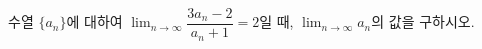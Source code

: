 수열 $\{a_n\}$에 대하여 $\displaystyle\lim_{n\to\infty}\dfrac{3a_n-2}{a_n+1}=2$일 때, $\displaystyle\lim_{n\to\infty}a_n$의 값을 구하시오.
